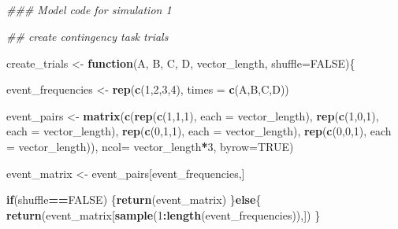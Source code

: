 \documentclass[
  english,
  man,floatsintext]{apa6}
\newenvironment{Shaded}{\begin{snugshade}}{\end{snugshade}}
\newcommand{\KeywordTok}[1]{\textcolor[rgb]{0.13,0.29,0.53}{\textbf{#1}}}
\newcommand{\DataTypeTok}[1]{\textcolor[rgb]{0.13,0.29,0.53}{#1}}
\newcommand{\DecValTok}[1]{\textcolor[rgb]{0.00,0.00,0.81}{#1}}
\newcommand{\StringTok}[1]{\textcolor[rgb]{0.31,0.60,0.02}{#1}}
\newcommand{\CommentTok}[1]{\textcolor[rgb]{0.56,0.35,0.01}{\textit{#1}}}
\newcommand{\OtherTok}[1]{\textcolor[rgb]{0.56,0.35,0.01}{#1}}
\newcommand{\ControlFlowTok}[1]{\textcolor[rgb]{0.13,0.29,0.53}{\textbf{#1}}}
\newcommand{\OperatorTok}[1]{\textcolor[rgb]{0.81,0.36,0.00}{\textbf{#1}}}
\newcommand{\NormalTok}[1]{#1}
\begin{document}
\begin{appendix}
\section{}
\singlespacing

\begin{Shaded}
\begin{Highlighting}[]
\CommentTok{### Model code for simulation 1}

\CommentTok{## create contingency task trials}

\NormalTok{create_trials <-}\StringTok{ }\ControlFlowTok{function}\NormalTok{(A, B, C, D, vector_length, }\DataTypeTok{shuffle=}\OtherTok{FALSE}\NormalTok{)\{}

\NormalTok{  event_frequencies <-}\StringTok{ }\KeywordTok{rep}\NormalTok{(}\KeywordTok{c}\NormalTok{(}\DecValTok{1}\NormalTok{,}\DecValTok{2}\NormalTok{,}\DecValTok{3}\NormalTok{,}\DecValTok{4}\NormalTok{), }\DataTypeTok{times =} \KeywordTok{c}\NormalTok{(A,B,C,D))}

\NormalTok{  event_pairs <-}\StringTok{ }\KeywordTok{matrix}\NormalTok{(}\KeywordTok{c}\NormalTok{(}\KeywordTok{rep}\NormalTok{(}\KeywordTok{c}\NormalTok{(}\DecValTok{1}\NormalTok{,}\DecValTok{1}\NormalTok{,}\DecValTok{1}\NormalTok{), }\DataTypeTok{each =}\NormalTok{ vector_length),}
\KeywordTok{rep}\NormalTok{(}\KeywordTok{c}\NormalTok{(}\DecValTok{1}\NormalTok{,}\DecValTok{0}\NormalTok{,}\DecValTok{1}\NormalTok{), }\DataTypeTok{each =}\NormalTok{ vector_length),}
\KeywordTok{rep}\NormalTok{(}\KeywordTok{c}\NormalTok{(}\DecValTok{0}\NormalTok{,}\DecValTok{1}\NormalTok{,}\DecValTok{1}\NormalTok{), }\DataTypeTok{each =}\NormalTok{ vector_length),}
\KeywordTok{rep}\NormalTok{(}\KeywordTok{c}\NormalTok{(}\DecValTok{0}\NormalTok{,}\DecValTok{0}\NormalTok{,}\DecValTok{1}\NormalTok{), }\DataTypeTok{each =}\NormalTok{ vector_length)),}
\DataTypeTok{ncol=}\NormalTok{ vector_length}\OperatorTok{*}\DecValTok{3}\NormalTok{,}
\DataTypeTok{byrow=}\OtherTok{TRUE}\NormalTok{)}

\NormalTok{  event_matrix <-}\StringTok{ }\NormalTok{event_pairs[event_frequencies,]}

\ControlFlowTok{if}\NormalTok{(shuffle}\OperatorTok{==}\OtherTok{FALSE}\NormalTok{) \{}\KeywordTok{return}\NormalTok{(event_matrix)}
\NormalTok{    \}}\ControlFlowTok{else}\NormalTok{\{}
\KeywordTok{return}\NormalTok{(event_matrix[}\KeywordTok{sample}\NormalTok{(}\DecValTok{1}\OperatorTok{:}\KeywordTok{length}\NormalTok{(event_frequencies)),])}
\NormalTok{    \}}


\end{Highlighting}
\end{Shaded}
\end{appendix}
\end{document}
